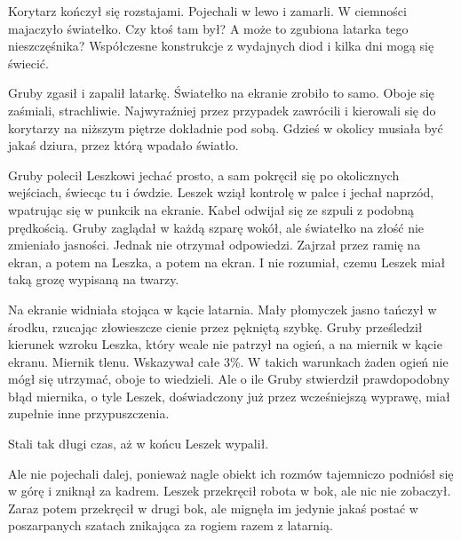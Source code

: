 Korytarz kończył się rozstajami.
Pojechali w lewo i zamarli.
W ciemności majaczyło światełko.
Czy ktoś tam był? A może to zgubiona latarka tego nieszczęśnika?
Współczesne konstrukcje z wydajnych diod i kilka dni mogą się świecić.

Gruby zgasił i zapalił latarkę. Światełko na ekranie zrobiło to samo.
Oboje się zaśmiali, strachliwie.
Najwyraźniej przez przypadek zawrócili i kierowali się do korytarzy na niższym piętrze dokładnie pod sobą.
Gdzieś w okolicy musiała być jakaś dziura, przez którą wpadało światło.

Gruby polecił Leszkowi jechać prosto, a sam pokręcił się po okolicznych wejściach, świecąc tu i ówdzie.
Leszek wziął kontrolę w palce i jechał naprzód, wpatrując się w punkcik na ekranie.
Kabel odwijał się ze szpuli z podobną prędkością.
Gruby zaglądał w każdą szparę wokół, ale światełko na złość nie zmieniało jasności.
Jednak nie otrzymał odpowiedzi.
Zajrzał przez ramię na ekran, a potem na Leszka, a potem na ekran. I nie rozumiał, czemu Leszek miał taką grozę wypisaną na twarzy.

Na ekranie widniała stojąca w kącie latarnia. Mały płomyczek jasno tańczył w środku, rzucając złowieszcze cienie przez pękniętą szybkę.
Gruby prześledził kierunek wzroku Leszka, który wcale nie patrzył na ogień, a na miernik w kącie ekranu.
Miernik tlenu.
Wskazywał całe 3\%.
W takich warunkach żaden ogień nie mógł się utrzymać, oboje to wiedzieli.
Ale o ile Gruby stwierdził prawdopodobny błąd miernika, o tyle Leszek, doświadczony już przez wcześniejszą wyprawę, miał zupełnie inne przypuszczenia.

Stali tak długi czas, aż w końcu Leszek wypalił.

Ale nie pojechali dalej, ponieważ nagle obiekt ich rozmów tajemniczo podniósł się w górę i zniknął za kadrem.
Leszek przekręcił robota w bok, ale nic nie zobaczył.
Zaraz potem przekręcił w drugi bok, ale mignęła im jedynie jakaś postać w poszarpanych szatach znikająca za rogiem razem z latarnią.

